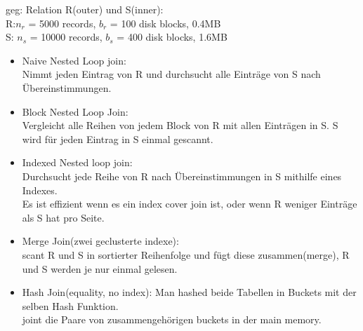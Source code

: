 \documentclass[12pt]{article}\pagestyle{myheadings}
\theoremstyle{plain}
\begin{document}
\begin{enumerate}
geg: Relation R(outer) und S(inner):\\
R:$ n_{r}$ = 5000 records, $b_{r}$ = 100 disk blocks, 0.4MB\\
S: $n_{s}$ = 10000 records, $b_{s}$ = 400 disk blocks, 1.6MB
\begin{itemize}
\item Naive Nested Loop join:\\
Nimmt jeden Eintrag von R und durchsucht alle Einträge von S nach Übereinstimmungen.
\item Block Nested Loop Join:\\
Vergleicht alle Reihen von jedem Block von R mit allen Einträgen in S.
S wird für jeden Eintrag in S einmal gescannt.
\item Indexed Nested loop join: \\Durchsucht jede  Reihe von R nach Übereinstimmungen in S mithilfe eines Indexes.\\
Es ist effizient wenn es ein index cover join ist, oder wenn R weniger Einträge als S hat pro Seite.
\item Merge Join(zwei geclusterte indexe):\\
scant R und S in sortierter Reihenfolge und fügt diese zusammen(merge), R und S werden je nur einmal gelesen.
\item Hash Join(equality, no index):
Man hashed beide Tabellen in Buckets mit der selben Hash Funktion.\\
joint die Paare von zusammengehörigen buckets in der main memory.


\end{itemize}
\end{enumerate}
\end{document}
